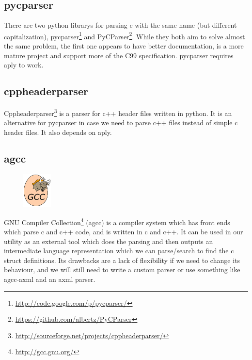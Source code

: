\subsection{\gls{pycparser}}
\label{sec:pre:pycparser}
There are two \Gls{python} \glspl{library} for parsing \Gls{c} with the same name (but different
capitalization), \gls{pycparser}\footnote{\url{http://code.google.com/p/pycparser/}}
and PyCParser\footnote{\url{https://github.com/albertz/PyCParser}}. While they
both aim to solve almost the same problem, the first one appears to have better
documentation, is a more mature project and support more of the \Gls{C99}
specification. \gls{pycparser} requires \Gls{aply} to work.

\subsection{cppheaderparser}
Cppheaderparser\footnote{\url{http://sourceforge.net/projects/cppheaderparser/}}
is a \gls{parser} for \Gls{c++} \gls{header} files written in \Gls{python}. It is an alternative for
\gls{pycparser} in case we need to parse \Gls{c++} files instead of simple \Gls{c} \gls{header} files.
It also depends on \Gls{aply}.

\subsection{\Gls{agcc}}
\label{sec:pre:gcc}
\begin{figure}
	\vspace{-20pt}
	\includegraphics[width=1.5cm]{./planning/img/gcc_logo}
	\vspace{-20pt}
\end{figure}
GNU Compiler Collection\footnote{\url{http://gcc.gnu.org/}} (\Gls{agcc}) is a
compiler system which has front ends which parse \Gls{c} and \Gls{c++} code, and is written
in \Gls{c} and \Gls{c++}. It can be used in our \gls{utility} as an external tool which does the
parsing and then outputs an intermediate language representation which we can
parse/search to find the \Gls{c} \gls{struct} definitions. Its drawbacks are a lack of
flexibility if we need to change its behaviour, and we will still need to write
a custom \gls{parser} or use something like \Gls{agcc}-\Gls{axml} and an \Gls{axml} \gls{parser}.


